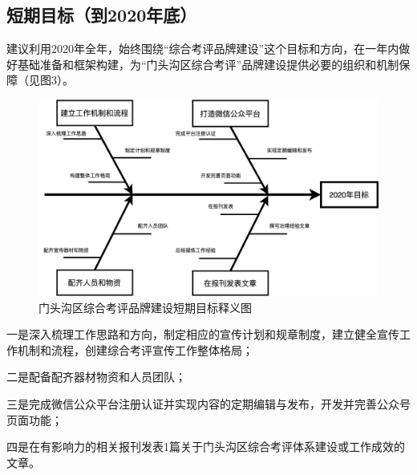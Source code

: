 \documentclass[12pt]{article} %
\begin{document}
\subsection{短期目标（到2020年底）}
建议利用2020年全年，始终围绕“综合考评品牌建设”这个目标和方向，在一年内做好基础准备和框架构建，为“门头沟区综合考评”品牌建设提供必要的组织和机制保障（见图3）。
\begin{figure}[ht]
\centering
\includegraphics[width=\textwidth]{figures/3.png}
\caption{门头沟区综合考评品牌建设短期目标释义图}
\label{fig:fig1}
\end{figure}

一是深入梳理工作思路和方向，制定相应的宣传计划和规章制度，建立健全宣传工作机制和流程，创建综合考评宣传工作整体格局；

二是配备配齐器材物资和人员团队；

三是完成微信公众平台注册认证并实现内容的定期编辑与发布，开发并完善公众号页面功能；

四是在有影响力的相关报刊发表1篇关于门头沟区综合考评体系建设或工作成效的文章。
\end{document}
